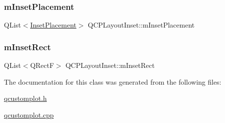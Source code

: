 \mbox{\label{class_q_c_p_layout_inset_a57a0a4e445cc78eada29765ecf092abe}} 
\subsubsection{\texorpdfstring{m\+Inset\+Placement}{mInsetPlacement}}
{\footnotesize\ttfamily Q\+List$<$\hyperlink{class_q_c_p_layout_inset_a8b9e17d9a2768293d2a7d72f5e298192}{Inset\+Placement}$>$ Q\+C\+P\+Layout\+Inset\+::m\+Inset\+Placement\hspace{0.3cm}{\ttfamily [protected]}}

\mbox{\label{class_q_c_p_layout_inset_aaa8f6b5029458f3d97a65239524a2b33}} 
\subsubsection{\texorpdfstring{m\+Inset\+Rect}{mInsetRect}}
{\footnotesize\ttfamily Q\+List$<$Q\+RectF$>$ Q\+C\+P\+Layout\+Inset\+::m\+Inset\+Rect\hspace{0.3cm}{\ttfamily [protected]}}



The documentation for this class was generated from the following files\+:\begin{DoxyCompactItemize}
\item 
\hyperlink{qcustomplot_8h}{qcustomplot.\+h}\item 
\hyperlink{qcustomplot_8cpp}{qcustomplot.\+cpp}\end{DoxyCompactItemize}
